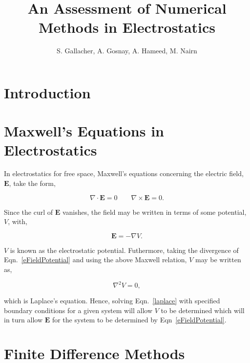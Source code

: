 \documentclass{article}
\renewcommand{\vec}[1]{\mathbf{#1}}
\begin{document}
\title{An Assessment of Numerical Methods in Electrostatics}
\author{S. Gallacher, A. Gosnay, A. Hameed, M. Nairn}
\maketitle


\begin{abstract}



\end{abstract}


\begin{multicols*}{2}

\section*{Introduction}




\section*{Maxwell's Equations in Electrostatics}

In electrostatics for free space, Maxwell's equations concerning the electric field, $\vec{E}$, take the form,

$$
\nabla \cdot \vec{E} = 0 \quad \quad \nabla \times \vec{E} = 0.
$$

Since the curl of $\vec{E}$ vanishes, the field may be written in terms of some potential, $V$, with,

\begin{equation}
\vec{E} = - \nabla V.
\label{eFieldPotential}
\end{equation}

$V$ is known as the electrostatic potential. Futhermore, taking the divergence of Eqn.~\ref{eFieldPotential} and using the above Maxwell relation, $V$ may be written as,

\begin{equation} 
\nabla^2 V = 0,
\label{laplace}
\end{equation}

\noindent which is Laplace's equation. Hence, solving Eqn.~\ref{laplace} with specified boundary conditions for a given system will allow $V$ to be determined which will in turn allow $\vec{E}$ for the system to be determined by Eqn~\ref{eFieldPotential}.

\section*{Finite Difference Methods}




\end{multicols*}
\end{document}
